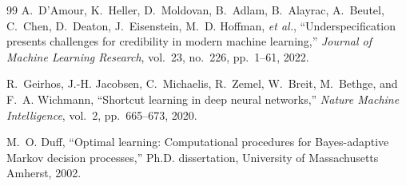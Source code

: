 \documentclass[conference]{IEEEtran}
\newcommand{\etal}{\textit{et al.}}
\begin{document}
\begin{thebibliography}{99}
A.~D'Amour, K.~Heller, D.~Moldovan, B.~Adlam, B.~Alayrac, A.~Beutel, C.~Chen, D.~Deaton, J.~Eisenstein, M.~D. Hoffman, \etal, ``Underspecification presents challenges for credibility in modern machine learning,'' \emph{Journal of Machine Learning Research}, vol.~23, no.~226, pp.~1--61, 2022.

R.~Geirhos, J.-H. Jacobsen, C.~Michaelis, R.~Zemel, W.~Breit, M.~Bethge, and F.~A. Wichmann, ``Shortcut learning in deep neural networks,'' \emph{Nature Machine Intelligence}, vol.~2, pp.~665--673, 2020.

M.~O. Duff, ``Optimal learning: Computational procedures for Bayes-adaptive Markov decision processes,'' Ph.D. dissertation, University of Massachusetts Amherst, 2002.

\end{thebibliography}
\end{document}
